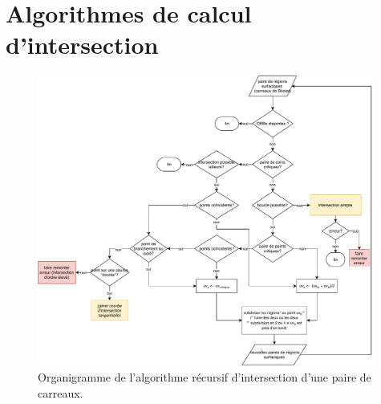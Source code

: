 \chapter{Algorithmes de calcul d'intersection}
\label{annexe:algos_intersection}

\begin{figure}[!htp]
	\centering
	\includegraphics[width=0.99\textwidth]{algorithmes/mindmap-intersect_surface_pair.pdf}
	\caption{Organigramme de l'algorithme récursif d'intersection d'une paire de carreaux.}
	\label{flowchart:intersect_surface_pair}
\end{figure}

